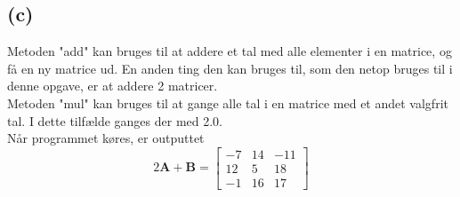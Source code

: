 \documentclass[12pt]{article}
\begin{document}
\subsection{(c)}
Metoden "add" kan bruges til at addere et tal med alle elementer i en matrice, og få en ny matrice ud. En anden ting den kan bruges til, som den netop bruges til i denne opgave, er at addere 2 matricer.\\
Metoden "mul" kan bruges til at gange alle tal i en matrice med et andet valgfrit tal. I dette tilfælde ganges der med 2.0.\\
Når programmet køres, er outputtet 
$$
2\mathbf{A+B}=
\begin{bmatrix}
-7&14&-11\\
12&5&18\\
-1&16&17
\end{bmatrix}
$$
\end{document}
